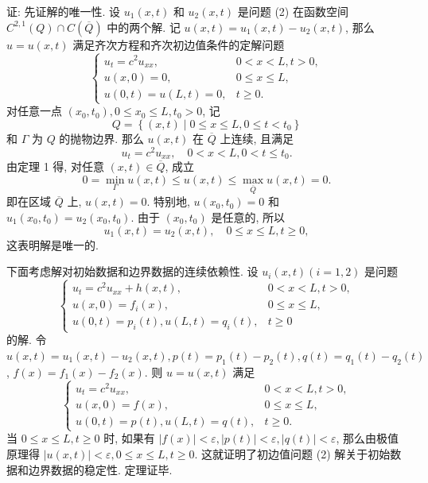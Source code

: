 证: 先证解的唯一性. 设 $ u_{1}(x, t) $ 和 $ u_{2}(x, t) $ 是问题 (2) 在函数空间 $ C^{2,1}(Q) \cap C(\overline{Q}) $ 中的两个解. 记 $ u(x, t)=u_{1}(x, t)-u_{2}(x, t) $, 那么 $ u=u(x, t) $ 满足齐次方程和齐次初边值条件的定解问题
$$
\left\{\begin{array}{ll}
u_{t}=c^{2} u_{x x}, & 0<x<L, t>0, \\
u(x, 0)=0, & 0 \leqslant x \leqslant L, \\
u(0, t)=u(L, t)=0, & t \geqslant 0 .
\end{array}\right.
$$
对任意一点 $ \left(x_{0}, t_{0}\right), 0 \leqslant x_{0} \leqslant L, t_{0}>0 $, 记
$$
Q=\left\{(x, t) \mid 0 \leqslant x \leqslant L, 0 \leqslant t<t_{0}\right\}
$$
和 $ \Gamma $ 为 $ Q $ 的抛物边界. 那么 $ u(x, t) $ 在 $ \overline{Q} $ 上连续, 且满足
$$
u_{t}=c^{2} u_{x x}, \quad 0<x<L, 0<t \leqslant t_{0} .
$$
由定理 1 得, 对任意 $ (x, t) \in \overline{Q} $, 成立
$$
0=\min _{\Gamma} u(x, t) \leqslant u(x, t) \leqslant \max _{\overline{Q}} u(x, t)=0 .
$$
即在区域 $ \overline{Q} $ 上, $ u(x, t)=0 $. 特别地, $ u\left(x_{0}, t_{0}\right)=0 $ 和 $ u_{1}\left(x_{0}, t_{0}\right)=u_{2}\left(x_{0}, t_{0}\right) $. 由于 $ \left(x_{0}, t_{0}\right) $ 是任意的, 所以
$$
u_{1}(x, t)=u_{2}(x, t), \quad 0 \leqslant x \leqslant L, t \geqslant 0,
$$
这表明解是唯一的.

下面考虑解对初始数据和边界数据的连续依赖性. 设 $ u_{i}(x, t)(i=1,2) $ 是问题
$$
\left\{\begin{array}{ll}
u_{t}=c^{2} u_{x x}+h(x, t), & 0<x<L, t>0, \\
u(x, 0)=f_{i}(x), & 0 \leqslant x \leqslant L, \\
u(0, t)=p_{i}(t), u(L, t)=q_{i}(t), & t \geqslant 0
\end{array}\right.
$$
的解. 令 $ u(x, t)=u_{1}(x, t)-u_{2}(x, t), p(t)=p_{1}(t)-p_{2}(t), q(t)=q_{1}(t)-q_{2}(t) $, $ f(x)=f_{1}(x)-f_{2}(x) $. 则 $ u=u(x, t) $ 满足
$$
\left\{\begin{array}{ll}
u_{t}=c^{2} u_{x x}, & 0<x<L, t>0, \\
u(x, 0)=f(x), & 0 \leqslant x \leqslant L, \\
u(0, t)=p(t), u(L, t)=q(t), & t \geqslant 0 .
\end{array}\right.
$$
当 $ 0 \leqslant x \leqslant L, t \geqslant 0 $ 时, 如果有 $ |f(x)|<\varepsilon,|p(t)|<\varepsilon,|q(t)|<\varepsilon $, 那么由极值原理得 $ |u(x, t)|<\varepsilon, 0 \leqslant x \leqslant L, t \geqslant 0 $. 这就证明了初边值问题 (2) 解关于初始数据和边界数据的稳定性. 定理证毕.



